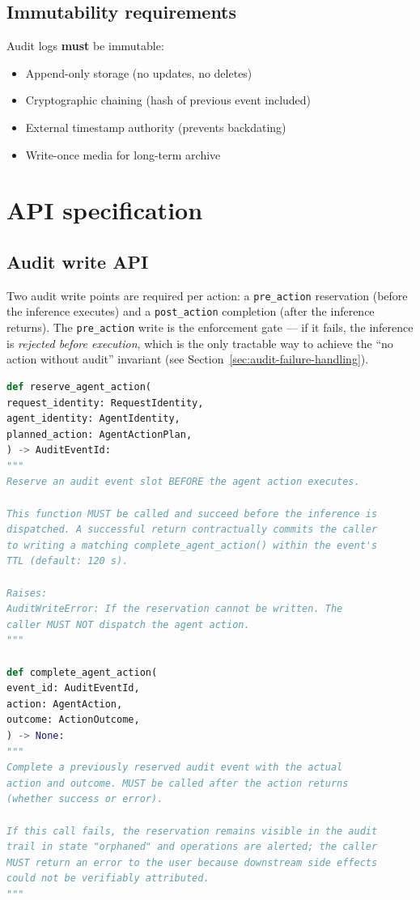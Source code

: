 \documentclass[11pt,a4paper,twoside]{report}
\begin{document}
\subsection{Immutability requirements}

Audit logs \textbf{must} be immutable:
\begin{itemize}
\item Append-only storage (no updates, no deletes)
\item Cryptographic chaining (hash of previous event included)
\item External timestamp authority (prevents backdating)
\item Write-once media for long-term archive
\end{itemize}

\section{API specification}

\subsection{Audit write API}

Two audit write points are required per action: a
\texttt{pre\_action} reservation (before the inference executes) and
a \texttt{post\_action} completion (after the inference returns). The
\texttt{pre\_action} write is the enforcement gate --- if it fails,
the inference is \emph{rejected before execution}, which is the only
tractable way to achieve the ``no action without audit'' invariant
(see Section~\ref{sec:audit-failure-handling}).

\begin{lstlisting}[language=Python,basicstyle=\ttfamily\small,caption={Audit service API contract.}]
def reserve_agent_action(
request_identity: RequestIdentity,
agent_identity: AgentIdentity,
planned_action: AgentActionPlan,
) -> AuditEventId:
"""
Reserve an audit event slot BEFORE the agent action executes.

This function MUST be called and succeed before the inference is
dispatched. A successful return contractually commits the caller
to writing a matching complete_agent_action() within the event's
TTL (default: 120 s).

Raises:
AuditWriteError: If the reservation cannot be written. The
caller MUST NOT dispatch the agent action.
"""

def complete_agent_action(
event_id: AuditEventId,
action: AgentAction,
outcome: ActionOutcome,
) -> None:
"""
Complete a previously reserved audit event with the actual
action and outcome. MUST be called after the action returns
(whether success or error).

If this call fails, the reservation remains visible in the audit
trail in state "orphaned" and operations are alerted; the caller
MUST return an error to the user because downstream side effects
could not be verifiably attributed.
"""
\end{lstlisting}
\end{document}
